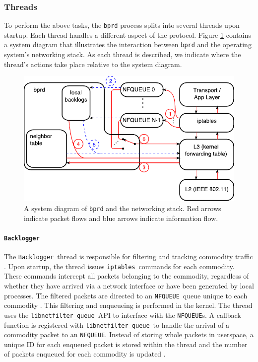 \documentclass{article}
\newcommand{\backlogger}{\texttt{Backlogger}}
\newcommand{\bprd}{\texttt{bprd}\xspace}
\newcommand{\iptables}{\texttt{iptables}}
\newcommand{\libnetfilterqueue}{\texttt{libnetfilter\_queue}}
\newcommand{\nfqueue}{\texttt{NFQUEUE}}
\newcommand*\circled[1]{\tikz[baseline=(char.base)]{
                \node[shape=circle,draw,inner sep=2pt] (char) {#1};}}
\begin{document}
\subsubsection{Threads}

To perform the above tasks, the \bprd process splits into several threads upon startup.
Each thread handles a different aspect of the protocol.
Figure \ref{fig:systemdiagram} contains a system diagram that illustrates the interaction between \bprd and the operating system's networking stack.
As each thread is described, we indicate where the thread's actions take place relative to the system diagram.
%
\begin{figure}[!ht]
	\centering
	\includegraphics[width=\textwidth]{img/systemdiagram.pdf}
	\caption{A system diagram of \bprd and the networking stack.  Red arrows indicate packet flows and blue arrows
    indicate information flow.}
	\label{fig:systemdiagram}
\end{figure}


\paragraph{\backlogger} The \backlogger\ thread is responsible for filtering and tracking commodity traffic \circled{5}.
Upon startup, the thread issues \iptables\ commands for each commodity.
These commands intercept all packets belonging to the commodity, regardless of whether they have arrived via a network interface or have been generated by local processes.
The filtered packets are directed to an \nfqueue\ queue unique to each commodity \circled{1}.
This filtering and enqueueing is performed in the kernel.
The thread uses the \libnetfilterqueue\ API to interface with the \nfqueue s.
A callback function is registered with \libnetfilterqueue\ to handle the arrival of a commodity packet to an \nfqueue.
Instead of storing whole packets in userspace, a unique ID for each enqueued packet is stored within the thread and the number of packets enqueued for each commodity is updated \circled{2}.
\end{document}
